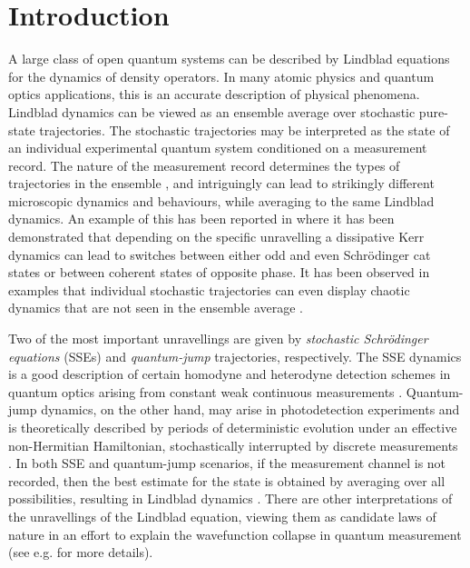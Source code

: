 \documentclass[12pt]{iopart} %
\begin{document}
\section{Introduction}

A large class of open quantum systems can be described by Lindblad equations for the dynamics of density operators. In many atomic physics and quantum optics applications, this is an accurate description of physical phenomena. Lindblad dynamics can be viewed as an ensemble average over stochastic pure-state trajectories. The stochastic trajectories may be interpreted as the state of an individual experimental quantum system conditioned on a measurement record. The nature of the measurement record determines the types of trajectories in the ensemble \cite{wisemanBook,belavkin1989nondemolition,carmichael2009open}, and intriguingly can lead to strikingly different microscopic dynamics and behaviours, while averaging to the same Lindblad dynamics.
An example of this has been reported in \cite{bartolo2017} where it has been demonstrated that depending on the specific unravelling a dissipative Kerr dynamics can lead to switches between either odd and even Schr\"{o}dinger cat states or between coherent states of opposite phase. It has been observed in examples that individual stochastic trajectories can even display chaotic dynamics that are not seen in the ensemble average \cite{eastman2017tuning}.

Two of the most important unravellings are given by \textit{stochastic Schr\"{o}dinger equations} (SSEs) and \textit{quantum-jump} trajectories, respectively. The SSE dynamics is a good description of certain homodyne and heterodyne detection schemes in quantum optics arising from constant weak continuous measurements \cite{wiseman1996quantum,verstraelen2018gaussian}. Quantum-jump dynamics, on the other hand, may arise in photodetection experiments and is theoretically described by periods of deterministic evolution under an effective non-Hermitian Hamiltonian, stochastically interrupted by discrete measurements \cite{plenio1998quantum}. In both SSE and quantum-jump scenarios,  if the measurement channel is not recorded, then the best estimate for the state is obtained by averaging over all possibilities, resulting in Lindblad dynamics \cite{wiseman1996quantum}. There are other interpretations of the unravellings of the Lindblad equation, viewing them as candidate laws of nature in an effort to explain the wavefunction collapse in quantum measurement (see e.g. \cite{ghirardi1986unified,bassi2013models,brody2002efficient,gisin1992quantum} for more details).
\end{document}

